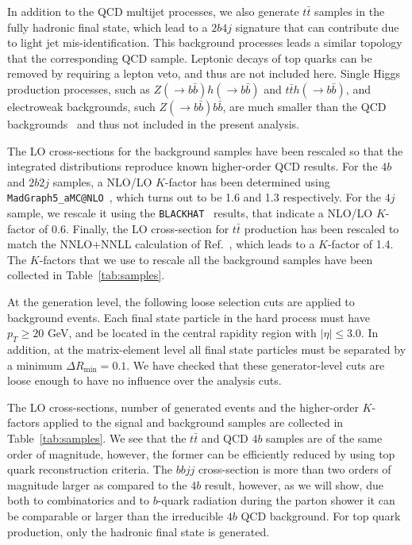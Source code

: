 In addition to the QCD multijet processes,
we also generate $t\bar{t}$ samples
in the fully hadronic final state, which lead to a
$2b4j$ signature that can
contribute due to light jet mis-identification.
%
This background processes leads a similar topology that
the corresponding QCD sample.
%
Leptonic decays of top quarks can be removed by requiring
a lepton veto, and thus are not included here.
%
Single Higgs production processes, such as $Z(\to b\bar{b})h(\to b\bar{b})$
and $t\bar{t}h(\to b\bar{b})$, and electroweak backgrounds, such $Z(\to b\bar{b})b\bar{b}$,
are much smaller than the QCD backgrounds~\cite{Wardrope:2014kya,deLima:2014dta}
and thus not included in the present analysis.
%



The LO cross-sections for
the background samples have been rescaled so that the integrated
distributions reproduce known higher-order QCD results.
%
For the $4b$ and $2b2j$ samples, a NLO/LO $K$-factor has been determined
using {\tt MadGraph5\_aMC@NLO}~\cite{Alwall:2014hca}, which turns out to be 1.6 and 1.3
respectively.
%
For the $4j$ sample, we rescale it using the {\tt BLACKHAT}~\cite{Bern:2011ep}
results, that indicate
a NLO/LO $K$-factor of 0.6.
%
Finally, the LO cross-section for $t\bar{t}$ production has been rescaled
to match the NNLO+NNLL calculation of Ref.~\cite{Czakon:2013goa}, which leads
to a $K$-factor of 1.4.
%
The $K$-factors that we use to rescale all the background samples have been collected in
Table~\ref{tab:samples}.


At the generation level, the following loose selection 
cuts are applied to
background events.
%
Each final state particle in the hard process must have $p_T \ge 20$ GeV, and be located
in the central  rapidity
region with
$| \eta | \le 3.0$.
%
In addition, at the matrix-element level
all final state particles must be separated by a minimum $\Delta R_{\mathrm{min}} =0.1$.
%
We have checked that these generator-level cuts are loose enough to have
no influence over the analysis cuts.
%


The LO cross-sections,
number of generated events and the higher-order $K$-factors
applied to the signal and background
samples are collected in Table~\ref{tab:samples}.
%
We see that the $t\bar{t}$ and QCD $4b$ samples are of
the same order of magnitude, however, the former can be efficiently
reduced by using top quark reconstruction criteria.
%
The $bbjj$ cross-section is more than two orders
of magnitude larger as compared to the
$4b$ result, however, as we will show,
due both to combinatorics and to $b$-quark radiation
during the parton shower it can be comparable or larger
than the irreducible $4b$ QCD background.
%
 For top quark production, only the hadronic final state is generated.
 

